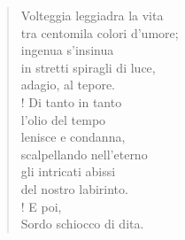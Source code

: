 
\begin{verse}
    Volteggia leggiadra la vita\\
    tra centomila colori d'umore;\\
    ingenua s'insinua\\
    in stretti spiragli di luce,\\
    adagio, al tepore.\\!
    Di tanto in tanto\\
    l'olio del tempo\\
    lenisce e condanna,\\
    scalpellando nell'eterno\\
    gli intricati abissi\\
    del nostro labirinto.\\!
    E poi,\\
    Sordo schiocco di dita.
    
\end{verse}